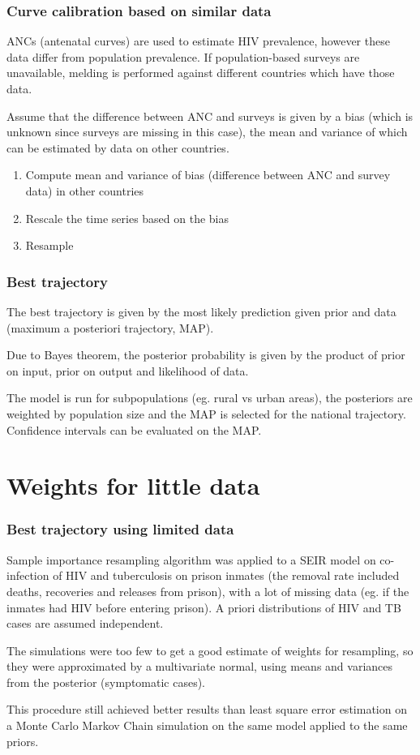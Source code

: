 \documentclass[aspectratio=43]{beamer}
\begin{document}
\begin{frame}
	\frametitle{Curve calibration based on similar data}
	ANCs (antenatal curves) are used to estimate HIV prevalence, however these data differ from population prevalence.
	If population-based surveys are unavailable, melding is performed against different countries which have those data.
	
	Assume that the difference between ANC and surveys is given by a bias (which is unknown since surveys are missing in this case), the mean and variance of which can be estimated by data on other countries.
	
	\begin{enumerate}
		\item Compute mean and variance of bias (difference between ANC and survey data) in other countries
		\item Rescale the time series based on the bias
		\item Resample
	\end{enumerate}
\end{frame}

\begin{frame}
	\frametitle{Best trajectory}
	The best trajectory is given by the most likely prediction given prior and data (maximum a posteriori trajectory, MAP).
	
	Due to Bayes theorem, the posterior probability is given by the product of prior on input, prior on output and likelihood of data.
	
	The model is run for subpopulations (eg. rural vs urban areas), the posteriors are weighted by population size and the MAP is selected for the national trajectory. Confidence intervals can be evaluated on the MAP.

\end{frame}


\section{Weights for little data~}

\begin{frame}
	\frametitle{Best trajectory using limited data}
	Sample importance resampling algorithm was applied to a SEIR model on co-infection of HIV and tuberculosis on prison inmates (the removal rate included deaths, recoveries and releases from prison), with a lot of missing data (eg. if the inmates had HIV before entering prison). A priori distributions of HIV and TB cases are assumed independent.
	
	The simulations were too few to get a good estimate of weights for resampling, so they were approximated by a multivariate normal, using means and variances from the posterior (symptomatic cases).
	
	This procedure still achieved better results than least square error estimation on a Monte Carlo Markov Chain simulation on the same model applied to the same priors.
	
\end{frame}
\end{document}

